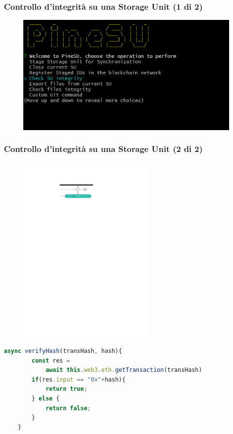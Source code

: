 \documentclass{beamer}
\begin{document}
\begin{frame}
	\frametitle{Controllo d'integrità su una Storage Unit (1 di 2)}
	\begin{figure}
		\includegraphics[width=\textwidth]{figures/ops/5.png}
	\end{figure}
\end{frame}

\begin{frame}[fragile]
	\frametitle{Controllo d'integrità su una Storage Unit (2 di 2)}
	\begin{figure}
		\includegraphics[width=0.6\textwidth]{figures/verify.pdf}
	\end{figure}
	\begin{lstlisting}[language=JavaScript, numbers=none]
	async verifyHash(transHash, hash){
		const res =
			await this.web3.eth.getTransaction(transHash)
		if(res.input == "0x"+hash){
			return true;
		} else {
			return false;
		}
	}
	\end{lstlisting}
\end{frame}
\end{document}
